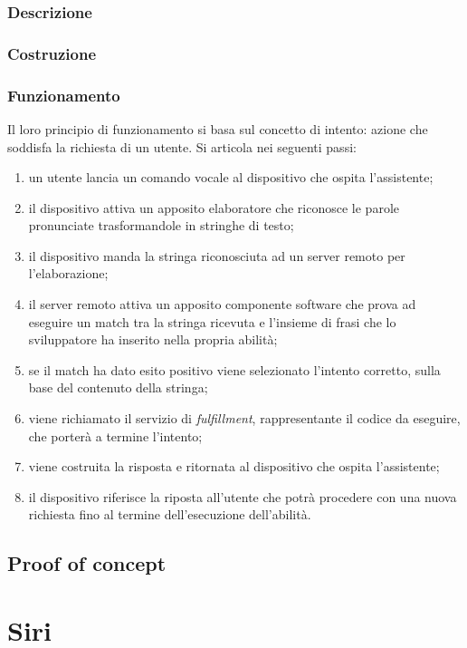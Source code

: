 		\subsubsection{Descrizione}
		
		\subsubsection{Costruzione}
		\subsubsection{Funzionamento}
		Il loro principio di funzionamento si basa sul concetto di intento: azione che soddisfa la richiesta di un utente. Si articola nei seguenti passi:
		\begin{enumerate}
			\item un utente lancia un comando vocale al dispositivo che ospita l'assistente;
			\item il dispositivo attiva un apposito elaboratore che riconosce le parole pronunciate trasformandole in stringhe di testo;
			\item il dispositivo manda la stringa riconosciuta ad un server remoto per l'elaborazione;
			\item il server remoto attiva un apposito componente software che prova ad eseguire un match tra la stringa ricevuta e l'insieme di frasi che lo sviluppatore ha inserito nella propria abilità;
			\item se il match ha dato esito positivo viene selezionato l'intento corretto, sulla base del contenuto della stringa;
			\item viene richiamato il servizio di \textit{fulfillment}, rappresentante il codice da eseguire, che porterà a termine l'intento;
			\item viene costruita la risposta e ritornata al dispositivo che ospita l'assistente;
			\item il dispositivo riferisce la riposta all'utente che potrà procedere con una nuova richiesta fino al termine dell'esecuzione dell'abilità.
		\end{enumerate}
	\subsection{Proof of concept}

\section{Siri}
